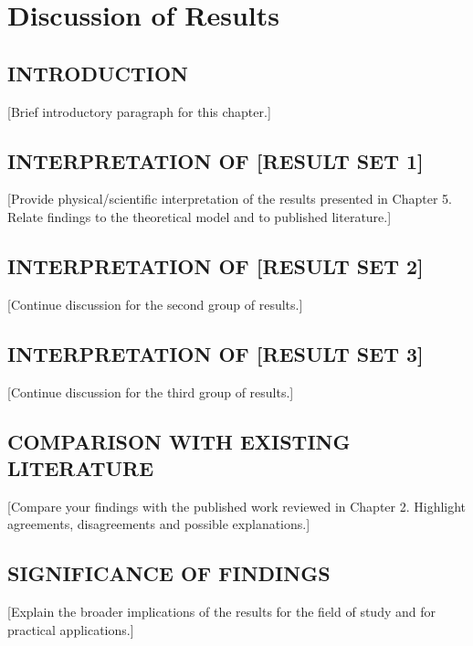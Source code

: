 \chapter{Discussion of Results}

\section{INTRODUCTION}

[Brief introductory paragraph for this chapter.]

\section{INTERPRETATION OF [RESULT SET 1]}

[Provide physical/scientific interpretation of the results
presented in Chapter 5. Relate findings to the theoretical
model and to published literature.]

\section{INTERPRETATION OF [RESULT SET 2]}

[Continue discussion for the second group of results.]

\section{INTERPRETATION OF [RESULT SET 3]}

[Continue discussion for the third group of results.]

\section{COMPARISON WITH EXISTING LITERATURE}

[Compare your findings with the published work reviewed in
Chapter 2. Highlight agreements, disagreements and possible
explanations.]

\section{SIGNIFICANCE OF FINDINGS}

[Explain the broader implications of the results for the
field of study and for practical applications.]

